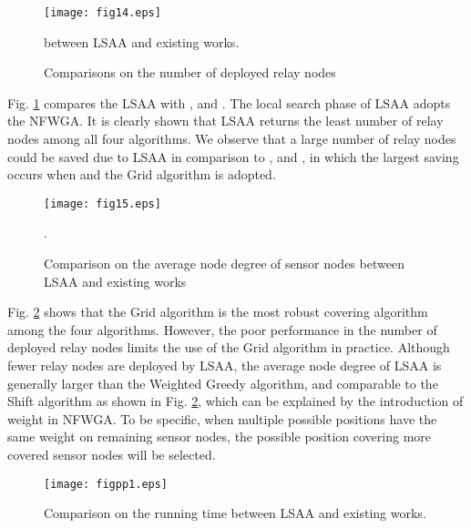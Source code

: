 \documentclass[journal]{IEEEtran}
\begin{document}
\begin{figure}
\begin{center}
\texttt{[image: fig14.eps]}    \caption{Comparisons on the number of deployed relay nodes} between LSAA and existing works.
\label{fig14}                                 \end{center}                                 \end{figure}

 Fig. \ref{fig14} compares the LSAA with \cite{Tang06}, \cite{Franceschetti01} and \cite{Ali11}. The local search phase of LSAA adopts the NFWGA.  It is clearly shown that LSAA returns the least number of relay nodes among all four algorithms. We observe that a large number of relay nodes could be saved due to LSAA in comparison to \cite{Tang06}, \cite{Franceschetti01} and \cite{Ali11}, in which the largest saving  occurs when  and the Grid algorithm is adopted.

 \begin{figure}
\begin{center}
\texttt{[image: fig15.eps]}    \caption{Comparison on the average node degree of sensor nodes between LSAA and existing works}.
\label{fig15}                                 \end{center}                                 \end{figure}

Fig. \ref{fig15} shows that the Grid algorithm is the most robust covering algorithm among the four algorithms. However, the poor performance in the number of deployed relay nodes limits the use of the Grid algorithm in practice. Although fewer relay nodes are deployed by LSAA, the average node degree of LSAA is generally larger than the Weighted Greedy algorithm, and comparable to the Shift algorithm as shown in Fig. \ref{fig15}, which can be explained by the introduction of weight  in NFWGA. To be specific, when multiple possible positions have the same weight  on remaining sensor nodes, the possible position covering more covered sensor nodes will be selected.

 \begin{figure}
\begin{center}
\texttt{[image: figpp1.eps]}    \caption{Comparison on the running time between LSAA and existing works.}
\label{figpp1}                                 \end{center}                                 \end{figure}
\end{document}
